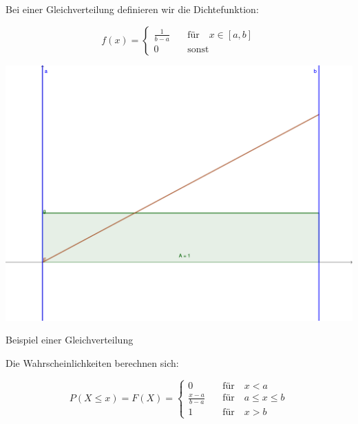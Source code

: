 \documentclass{tufte-handout}
\theoremstyle{own}
\begin{document}
Bei einer Gleichverteilung definieren wir die Dichtefunktion:

\begin{equation}
f(x) = \begin{cases}
\frac{1}{b-a} \hspace{1em} &\text{für} \hspace{1em} x \in [a,b] \\
0 \hspace{1em} &\text{sonst}
\end{cases}
\end{equation}

\begin{marginfigure}
	\includegraphics{gleichverteilung}
	\caption{Beispiel einer Gleichverteilung}
\end{marginfigure}

Die Wahrscheinlichkeiten berechnen sich:

\begin{equation}
P(X\leq x) = F(X) = \begin{cases}
0 \hspace{1em} & \text{für}  \hspace{1em} x < a \\
\frac{x-a}{b-a} \hspace{1em} & \text{für}  \hspace{1em} a \leq x \leq b \\
1 \hspace{1em} & \text{für}  \hspace{1em} x > b
\end{cases}
\end{equation}
\end{document}
